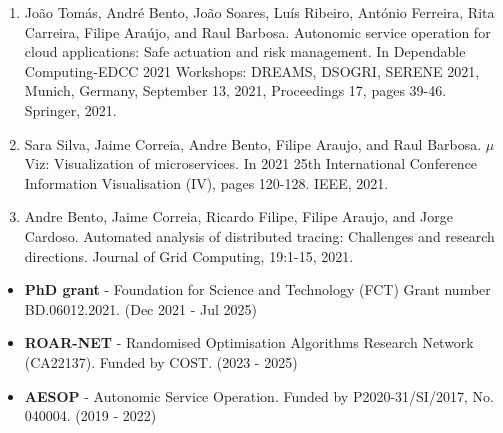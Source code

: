 \documentclass[a4paper,12pt]{memoir}
\begin{document}
\begin{enumerate}
	\item João Tomás, André Bento, João Soares, Luís Ribeiro, António Ferreira,
	Rita Carreira, Filipe Araújo, and Raul Barbosa. Autonomic service operation 
	for cloud applications: Safe actuation and risk management. In Dependable 
	Computing-EDCC 2021 Workshops: DREAMS, DSOGRI, SERENE 2021, Munich, Germany, 
	September 13, 2021, Proceedings 17, pages 39-46. Springer, 2021.%
	\item Sara Silva, Jaime Correia, Andre Bento, Filipe Araujo, and Raul 
	Barbosa. $\mu$Viz: Visualization of microservices. In 2021 25th 
	International Conference Information Visualisation (IV), pages 120-128. 
	IEEE, 2021.%
	\item Andre Bento, Jaime Correia, Ricardo Filipe, Filipe Araujo, and Jorge 
	Cardoso. Automated analysis of distributed tracing: Challenges and research
	directions. Journal of Grid Computing, 19:1-15, 2021.%
\end{enumerate}

\Sep

\clearpage

\userinformation

\framebreak


\begin{itemize}
    \item \textbf{PhD grant} - Foundation for Science and Technology (FCT) Grant number BD.06012.2021. (Dec 2021 - Jul 2025)
    \item \textbf{ROAR-NET} - Randomised Optimisation Algorithms Research Network (CA22137). Funded by COST. (2023 - 2025)
    \item \textbf{AESOP} - Autonomic Service Operation. Funded by P2020-31/SI/2017, No. 040004. (2019 - 2022) 
\end{itemize}

\Sep



\end{document}
